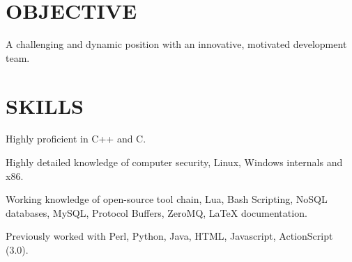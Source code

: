 \documentclass[margin]{res}
\begin{document}
 
 

\address{david.andrews112@gmail.com \ \ \ (949) 633-0588}


 
\begin{resume}  

\section{OBJECTIVE}
A challenging and dynamic position with an innovative, motivated development team.


\section{SKILLS}
\begin{list}{}{\leftmargin=0em \topsep=0pt \partopsep=0pt \parsep=2.5pt}
  \item Highly proficient in C++ and C.
  \item Highly detailed knowledge of computer security, Linux, Windows internals and x86.
  \item Working knowledge of open-source tool chain, Lua, Bash Scripting, NoSQL
    databases, MySQL, Protocol Buffers, ZeroMQ, \LaTeX{} documentation.
  \item Previously worked with Perl, Python, Java, HTML, Javascript, ActionScript (3.0).
\end{list}






\end{resume}
\end{document}
